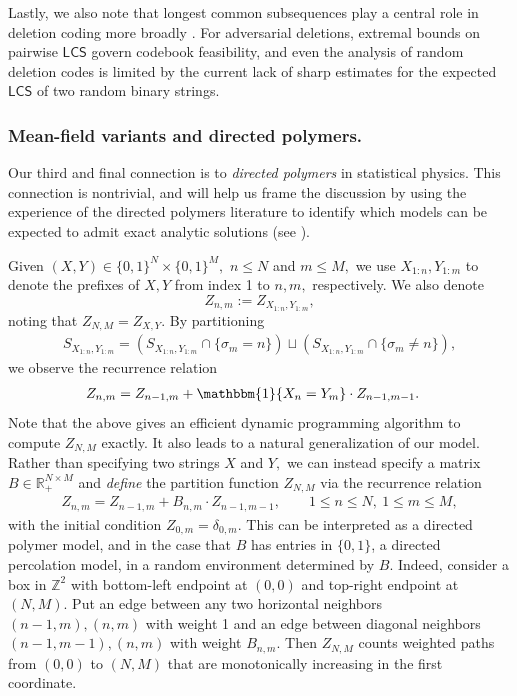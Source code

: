\documentclass[11pt]{amsart}
\numberwithin{equation}{section}
\numberwithin{equation}{section}
\newcommand{\1}{\mathbbm{1}}
\newcommand{\R}{\mathbb{R}}
\newcommand{\Z}{\mathbb{Z}}
\newcommand{\LCS}{\mathsf{LCS}}
\theoremstyle{definition}
\begin{document}
Lastly, we also note that longest common subsequences play a central role in deletion coding more broadly \cite{guruswami2022zero}. For adversarial deletions, extremal bounds on pairwise $\LCS$ govern codebook feasibility, and even the analysis of random deletion codes is limited by the current lack of sharp estimates for the expected $\LCS$ of two random binary strings.

\subsubsection{Mean-field variants and directed polymers.} \label{subsubsec:mean-field}

Our third and final connection is to \emph{directed polymers} in statistical physics. This connection is nontrivial, and will help us frame the discussion by using the experience of the directed polymers literature to identify which models can be expected to admit exact analytic solutions (see ). 

Given $(X,Y)\in \{0,1\}^N\times \{0,1\}^M,$ $n\leq N$ and $m\leq M,$ we use $X_{1:n}, Y_{1:m}$ to denote the prefixes of $X,Y$ from index 1 to $n,m,$ respectively. We also denote
\[
Z_{n,m} := Z_{X_{1:n}, Y_{1:m}},
\]
noting that $Z_{N,M} = Z_{X,Y}.$ By partitioning
\begin{align*}
    S_{X_{1:n},Y_{1:m}} = (S_{X_{1:n},Y_{1:m}}\cap \{\sigma_m = n\})\sqcup (S_{X_{1:n},Y_{1:m}}\cap \{\sigma_m \neq n\}),
\end{align*}
we observe the recurrence relation
\begin{align} \label{eq:Z-recurrence}
    Z_{n,m} &= Z_{n-1, m} + \1\{X_n = Y_m\}\cdot Z_{n-1,m-1}.
\end{align}
Note that the above gives an efficient dynamic programming algorithm to compute $Z_{N,M}$ exactly. It also leads to a natural generalization of our model. Rather than specifying two strings $X$ and $Y,$ we can instead specify a matrix $B \in \R_+^{N\times M}$ and \emph{define} the partition function $Z_{N,M}$ via the recurrence relation
\begin{align}\label{eq:Z-B-recurrence}
    Z_{n,m} = Z_{n-1, m} +B_{n,m}\cdot Z_{n-1,m-1}, \qquad 1\leq n\leq N,\ 1\leq m\leq M,
\end{align}
with the initial condition $Z_{0,m} = \delta_{0,m}.$ This can be interpreted as a directed polymer model, and in the case that $B$ has entries in $\{0,1\}$, a directed percolation model, in a random environment determined by $B$. Indeed, consider a box in $\Z^2$ with bottom-left endpoint at $(0,0)$ and top-right endpoint at $(N,M).$ Put an edge between any two horizontal neighbors $(n-1,m),(n,m)$ with weight 1 and an edge between diagonal neighbors $(n-1,m-1),(n,m)$ with weight $B_{n,m}.$ Then $Z_{N,M}$ counts weighted paths from $(0,0)$ to $(N,M)$ that are monotonically increasing in the first coordinate.
\end{document}
